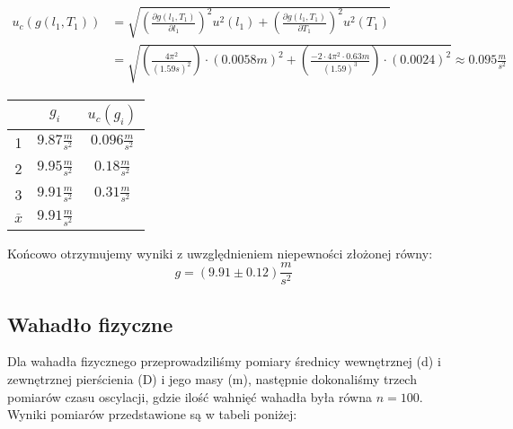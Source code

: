 \begin{equation*}
    \begin{aligned}
        u_c(g(l_1, T_1)) &= \sqrt{ \left( \frac{\partial g(l_1, T_1)}{\partial l_1} \right)^2 u^2(l_1) +  \left( \frac{\partial g(l_1, T_1)}{\partial T_1} \right)^2 u^2(T_1)} \\
        &= \sqrt{ \left( \frac{4\pi^2}{(1.59s)^2} \right) \cdot (0.0058m)^2 + \left( \frac{-2 \cdot 4\pi^2 \cdot 0.63m}{(1.59)^3} \right) \cdot (0.0024)^2 } \approx 0.095 \frac{m}{s^2}
    \end{aligned}
\end{equation*}

\begin{center}
    \begin{tabular}[h]{|c|c|c|}
        \hline
        {}             & $g_i$ & $u_c(g_i)$ \\
        \hline
        1              & $9.87 \frac{m}{s^2}$ & $0.096 \frac{m}{s^2}$ \\
        2              & $9.95 \frac{m}{s^2}$ & $0.18  \frac{m}{s^2}$ \\
        3              & $9.91 \frac{m}{s^2}$ & $0.31  \frac{m}{s^2} $ \\
        \hline
        $\overline{x}$ & $9.91 \frac{m}{s^2}$ & \cellcolor{black!10} \\
        \hline
    \end{tabular}
\end{center}

Końcowo otrzymujemy wyniki z uwzględnieniem niepewności złożonej równy:
$$ g = (9.91 \pm 0.12) \frac{m}{s^2}$$

{\subsection{Wahadło fizyczne}}

Dla wahadła fizycznego przeprowadziliśmy pomiary średnicy wewnętrznej (d) i zewnętrznej pierścienia (D) i jego masy (m), następnie dokonaliśmy trzech pomiarów czasu oscylacji, gdzie ilość wahnięć wahadła była równa $n = 100$.
Wyniki pomiarów przedstawione są w tabeli poniżej: \\

